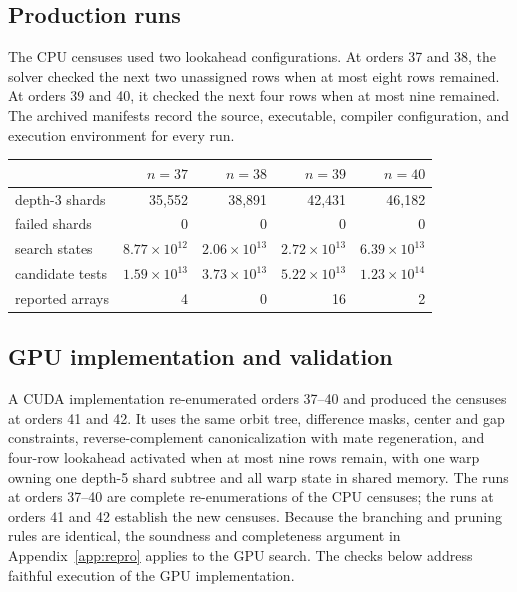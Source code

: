 \documentclass[11pt]{article}
\begin{document}
\subsection{Production runs}

The CPU censuses used two lookahead configurations.  At orders 37 and
38, the solver checked the next two unassigned rows when at most eight
rows remained.  At orders 39 and 40, it checked the next four rows when
at most nine remained.  The archived manifests record the source,
executable, compiler configuration, and execution environment for every
run.

\begin{center}
\begin{tabular}{lrrrr}
\toprule
 & $n=37$ & $n=38$ & $n=39$ & $n=40$ \\
\midrule
depth-3 shards & 35{,}552 & 38{,}891 & 42{,}431 & 46{,}182 \\
failed shards & 0 & 0 & 0 & 0 \\
search states & $8.77\times 10^{12}$ & $2.06\times 10^{13}$ & $2.72\times 10^{13}$ & $6.39\times 10^{13}$ \\
candidate tests & $1.59\times 10^{13}$ & $3.73\times 10^{13}$ & $5.22\times 10^{13}$ & $1.23\times 10^{14}$ \\
reported arrays & 4 & 0 & 16 & 2 \\
\bottomrule
\end{tabular}
\end{center}

\subsection{GPU implementation and validation}
\label{app:gpu}

A CUDA implementation re-enumerated orders 37--40 and produced the
censuses at orders 41 and 42.  It uses the same orbit tree, difference
masks, center and gap constraints,
reverse-complement canonicalization with mate regeneration, and four-row
lookahead activated when at most nine rows remain, with one warp owning
one depth-5 shard subtree and all warp state in shared memory.  The runs
at orders 37--40 are complete
re-enumerations of the CPU censuses; the runs at orders 41 and 42 establish
the new censuses.  Because the branching and pruning rules are identical,
the soundness and completeness argument in Appendix~\ref{app:repro}
applies to the GPU search.  The checks below address faithful execution of
the GPU implementation.
\end{document}
